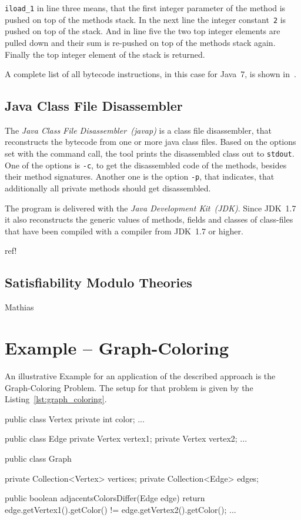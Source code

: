 \documentclass[conference]{IEEEtran}
\begin{document}
\texttt{iload\_1} in line three means, that the first integer parameter of the
method is pushed on top of the methods stack. In the next line the integer
constant~\texttt{2} is pushed on top of the stack. And in line five the two top
integer elements are pulled down and their sum is re-pushed on top of the
methods stack again. Finally the top integer element of the stack is returned.

A complete list of all bytecode instructions, in this case for Java~7, is shown
in~\cite{LindholmYBB11}.

\subsection{Java Class File Disassembler}
\label{sec:prelim_javap}

The \emph{Java Class File Disassembler~(javap)} is a class file disassembler,
that reconstructs the bytecode from one or more java class files. Based on the
options set with the command call, the tool prints the disassembled class out
to \texttt{stdout}. One of the options is \texttt{-c}, to get the disassembled
code of the methods, besides their method signatures. Another one is the option
\texttt{-p}, that indicates, that additionally all private methods should get
disassembled.

The program is delivered with the \emph{Java Development Kit~(JDK)}. Since
JDK~1.7 it also reconstructs the generic values of methods, fields and classes
of class-files that have been compiled with a compiler from JDK~1.7 or higher.

\danger ref!

\subsection{Satisfiability Modulo Theories}
\label{sec:prelim_smt}

\danger Mathias

\section{Example -- Graph-Coloring}
\label{sec:example}

An illustrative Example for an application of the described approach is the
Graph-Coloring Problem. The setup for that problem is given by the
Listing~\ref{lst:graph_coloring}.

\begin{javalisting}[label=lst:graph_coloring,caption=Example]
public class Vertex {
  private int color;
  ...
}

public class Edge {
  private Vertex vertex1;
  private Vertex vertex2;
  ...
}

public class Graph {
  private Collection<Vertex> vertices;
  private Collection<Edge> edges;

  public boolean adjacentsColorsDiffer(Edge edge) {
    return edge.getVertex1().getColor() != edge.getVertex2().getColor();
  }
  ...
}
\end{javalisting}
\end{document}
